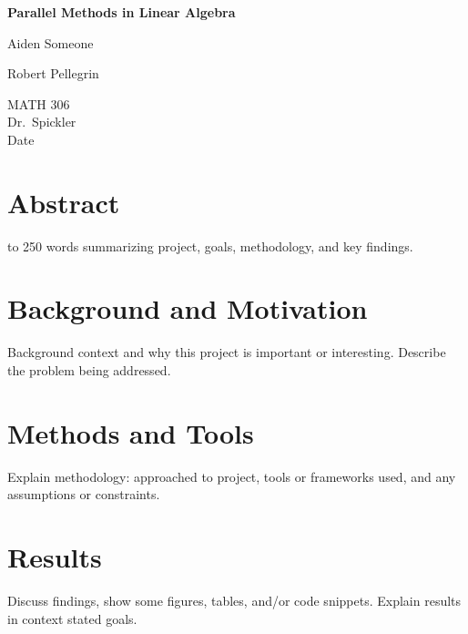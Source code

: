 \documentclass[12pt]{article}
\begin{document}
\begin{titlepage}
    \centering
    \vspace*{2in}
    {\Huge\bfseries Parallel Methods in Linear Algebra\par}
    \vspace{1in}
    {\Large Aiden Someone\par}
    {\Large Robert Pellegrin\par}
    \vspace{0.5in}
    {\large MATH 306\\ Dr.\ Spickler \\ Date\par}
    \vfill
\end{titlepage}

\newpage
\section*{Abstract}
\begin{singlespace}
     to 250 words summarizing project, goals, methodology, and key findings.
\end{singlespace}

\section{Background and Motivation}
Background context and why this project is important or interesting. Describe the problem being addressed.

\section{Methods and Tools}
Explain methodology: approached to project, tools or frameworks used, and any assumptions or constraints.

\section{Results}
Discuss findings, show some figures, tables, and/or code snippets.
Explain results in context stated goals.
\end{document}
